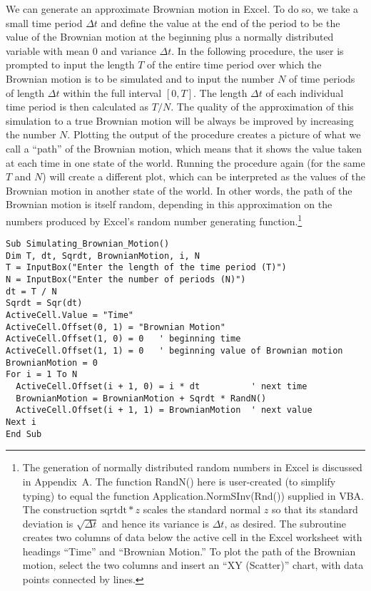 We can generate an approximate Brownian motion in Excel.  To do so, we take a small time period $\varDelta t$ and define the value at the end of the period to be the value of the Brownian motion at the beginning plus a normally distributed variable with mean 0 and variance $\varDelta t$.  In the following procedure, the user is prompted to input the length $T$ of the entire time period over which the Brownian motion is to be simulated and to input the number $N$ of time periods of length $\varDelta t$ within the full interval $[0,T]$.  The length $\varDelta t$ of each individual time period is then calculated as $T/N$.  The quality of the approximation of this simulation to a true Brownian motion will be always be improved by increasing the number $N$.  Plotting the output of the procedure creates a picture of what we call a ``path'' of the Brownian motion, which means that it shows the value taken at each time in one state of the world.  Running the procedure again (for the same $T$ and $N$) will create a different plot, which can be interpreted as the values of the Brownian motion in another state of the world.  In other words, the path of the Brownian motion is itself random, depending in this approximation on the numbers produced by Excel's random number generating function.\footnote{The generation of normally distributed random numbers in Excel is discussed in Appendix~A.  The function RandN() here is user-created (to simplify typing) to equal the function Application.NormSInv(Rnd()) supplied in VBA.  The construction $\text{sqrtdt}*z$ scales the standard normal $z$ so that its standard deviation is $\sqrt{\varDelta t}$ and hence its variance is $\varDelta t$, as desired.  The subroutine creates two columns of data below the active cell in the Excel worksheet with headings ``Time'' and ``Brownian Motion.''  To plot the path of the Brownian motion, select the two columns and insert an ``XY (Scatter)'' chart, with data points connected by lines.}

\small\begin{verbatim}
Sub Simulating_Brownian_Motion()
Dim T, dt, Sqrdt, BrownianMotion, i, N
T = InputBox("Enter the length of the time period (T)")
N = InputBox("Enter the number of periods (N)")
dt = T / N
Sqrdt = Sqr(dt)
ActiveCell.Value = "Time"
ActiveCell.Offset(0, 1) = "Brownian Motion"
ActiveCell.Offset(1, 0) = 0   ' beginning time
ActiveCell.Offset(1, 1) = 0   ' beginning value of Brownian motion
BrownianMotion = 0
For i = 1 To N
  ActiveCell.Offset(i + 1, 0) = i * dt          ' next time
  BrownianMotion = BrownianMotion + Sqrdt * RandN()
  ActiveCell.Offset(i + 1, 1) = BrownianMotion  ' next value
Next i
End Sub
\end{verbatim}\normalsize




